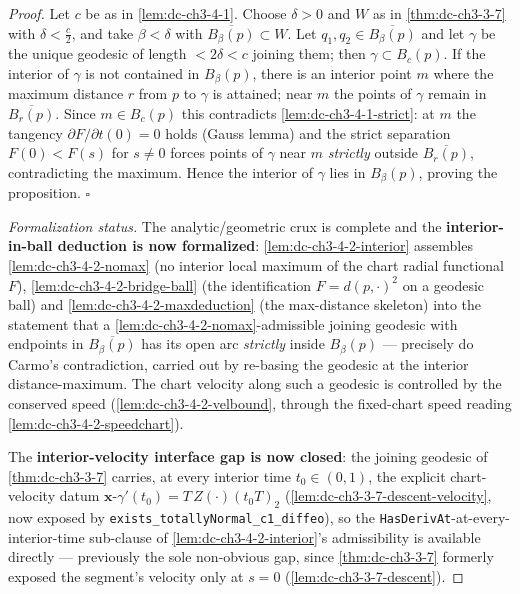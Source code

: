 \begin{proof}
  \leanok
  Let $c$ be as in \cref{lem:dc-ch3-4-1}. Choose $\delta>0$ and $W$ as in \cref{thm:dc-ch3-3-7}
  with $\delta<\frac{c}{2}$, and take $\beta<\delta$ with $\overline{B_\beta(p)}\subset W$. Let
  $q_1,q_2\in\overline{B_\beta(p)}$ and let $\gamma$ be the unique geodesic of length
  $<2\delta<c$ joining them; then $\gamma\subset B_c(p)$. If the interior of
  $\gamma$ is not contained in $B_\beta(p)$, there is an interior point $m$ where the
  maximum distance $r$ from $p$ to $\gamma$ is attained; near $m$ the points of
  $\gamma$ remain in $\overline{B_r(p)}$. Since $m\in B_c(p)$ this contradicts
  \cref{lem:dc-ch3-4-1-strict}: at $m$ the tangency $\partial F/\partial t(0)=0$ holds
  (Gauss lemma) and the strict separation $F(0)<F(s)$ for $s\neq0$ forces points of
  $\gamma$ near $m$ \emph{strictly} outside $\overline{B_r(p)}$, contradicting the
  maximum. Hence the interior of $\gamma$ lies in $B_\beta(p)$, proving the proposition. $\square$

  \emph{Formalization status.} The analytic/geometric crux is complete and the
  \textbf{interior-in-ball deduction is now formalized}: \cref{lem:dc-ch3-4-2-interior} assembles
  \cref{lem:dc-ch3-4-2-nomax} (no interior local maximum of the chart radial functional $F$),
  \cref{lem:dc-ch3-4-2-bridge-ball} (the identification $F=d(p,\cdot)^2$ on a geodesic ball) and
  \cref{lem:dc-ch3-4-2-maxdeduction} (the max-distance skeleton) into the statement that a
  \cref{lem:dc-ch3-4-2-nomax}-admissible joining geodesic with endpoints in $\overline{B_\beta(p)}$
  has its open arc \emph{strictly} inside $B_\beta(p)$ — precisely do Carmo's contradiction, carried
  out by re-basing the geodesic at the interior distance-maximum. The chart velocity along such a
  geodesic is controlled by the conserved speed (\cref{lem:dc-ch3-4-2-velbound}, through the
  fixed-chart speed reading \cref{lem:dc-ch3-4-2-speedchart}).

  The \textbf{interior-velocity interface gap is now closed}: the joining geodesic of
  \cref{thm:dc-ch3-3-7} carries, at every interior time $t_0\in(0,1)$, the explicit chart-velocity datum
  $\mathbf{x}$-$\gamma'(t_0)=T\,Z(\cdot)(t_0T)_2$ (\cref{lem:dc-ch3-3-7-descent-velocity}, now exposed by
  \texttt{exists\_totallyNormal\_c1\_diffeo}), so the \texttt{HasDerivAt}-at-every-interior-time sub-clause of
  \cref{lem:dc-ch3-4-2-interior}'s admissibility is available directly — previously the sole non-obvious gap,
  since \cref{thm:dc-ch3-3-7} formerly exposed the segment's velocity only at $s=0$
  (\cref{lem:dc-ch3-3-7-descent}).


\end{proof}
